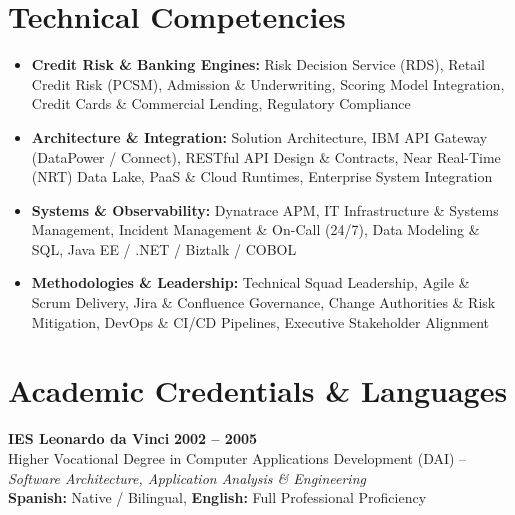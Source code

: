 \documentclass[10pt,a4paper]{article}
\begin{document}
\section{Technical Competencies}
\begin{itemize}[leftmargin=1.5em, itemsep=2pt, topsep=2pt]
\item \textbf{Credit Risk \& Banking Engines:} Risk Decision Service (RDS), Retail Credit Risk (PCSM), Admission \& Underwriting, Scoring Model Integration, Credit Cards \& Commercial Lending, Regulatory Compliance\item \textbf{Architecture \& Integration:} Solution Architecture, IBM API Gateway (DataPower / Connect), RESTful API Design \& Contracts, Near Real-Time (NRT) Data Lake, PaaS \& Cloud Runtimes, Enterprise System Integration\item \textbf{Systems \& Observability:} Dynatrace APM, IT Infrastructure \& Systems Management, Incident Management \& On-Call (24/7), Data Modeling \& SQL, Java EE / .NET / Biztalk / COBOL\item \textbf{Methodologies \& Leadership:} Technical Squad Leadership, Agile \& Scrum Delivery, Jira \& Confluence Governance, Change Authorities \& Risk Mitigation, DevOps \& CI/CD Pipelines, Executive Stakeholder Alignment
\end{itemize}

\section{Academic Credentials & Languages}
\noindent\textbf{IES Leonardo da Vinci} \hfill {\textbf{2002 -- 2005}} \\
Higher Vocational Degree in Computer Applications Development (DAI) -- \textit{Software Architecture, Application Analysis \& Engineering}\\

\vspace{6pt}
\noindent \textbf{Spanish:} Native / Bilingual, \textbf{English:} Full Professional Proficiency
\end{document}
